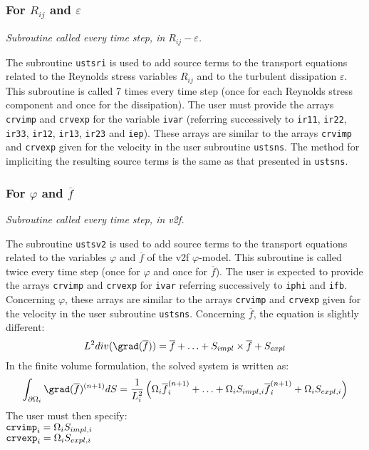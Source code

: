 {{{%
\subsubsection{For $R_{ij}$ and $\varepsilon$}

\noindent
\textit{Subroutine called every time step, in $R_{ij}-\varepsilon$.}

The subroutine \texttt{ustsri} is used to add source terms to the transport equations
related to the Reynolds stress variables $R_{ij}$ and to the turbulent
dissipation $\varepsilon$.
This subroutine is called 7 times every time step
(once for each Reynolds stress component and once for the
dissipation). The user must provide the arrays \texttt{crvimp} and
\texttt{crvexp} for the variable \texttt{ivar} (referring successively to
\texttt{ir11}, \texttt{ir22}, \texttt{ir33},
\texttt{ir12}, \texttt{ir13}, \texttt{ir23} and
\texttt{iep}). These arrays are similar to the arrays \texttt{crvimp}
and \texttt{crvexp} given for the velocity in the user subroutine
\texttt{ustsns}. The method for impliciting the resulting source terms is the
same as that presented in \texttt{ustsns}.

\subsubsection{For $\varphi$ and $\overline{f}$}
\label{prg_ustsv2}

\noindent
\textit{Subroutine called every time step, in v2f.}

The subroutine \texttt{ustsv2} is used to add source terms to the transport equations
related to the variables $\varphi$ and $\overline{f}$ of the v2f
$\varphi$-model. This subroutine is called twice
every time step (once for $\varphi$ and once for $\overline{f}$).
The user is expected to provide the arrays \texttt{crvimp} and
\texttt{crvexp} for \texttt{ivar} referring successively to \texttt{iphi}
and \texttt{ifb}. Concerning $\varphi$, these arrays are similar to the arrays
\texttt{crvimp} and \texttt{crvexp} given for the velocity in the user subroutine
\texttt{ustsns}. Concerning $\overline{f}$, the equation is slightly
different:
\begin{displaymath}
L^2 div(\grad(\overline{f})) = \overline{f} + \ldots + S_{impl}\times\overline{f}+S_{expl}
\end{displaymath}
In the finite volume formulation, the solved system is written as:
\begin{displaymath}
\int_{\partial\Omega_i}\grad(\overline{f})^{(n+1)}dS=\frac{1}{L_i^2}\left(
\Omega_i\overline{f}^{(n+1)}_i + \ldots +  \Omega_iS_{impl,i}\overline{f}_i^{(n+1)} +
\Omega_iS_{expl,i} \right)
\end{displaymath}
The user must then specify:\\
$\text{\texttt{crvimp}}_i=\Omega_iS_{impl,i}$\\
$\text{\texttt{crvexp}}_i=\Omega_iS_{expl,i}$

}}}
